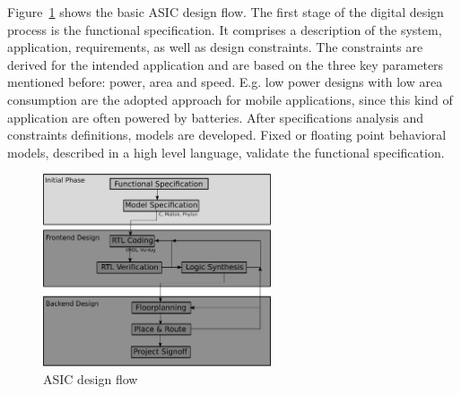 



Figure~\ref{fig:asic_flow} shows the basic ASIC design flow. The first stage of the digital design process is the functional specification. It comprises a description of the system, application, requirements, as well as design constraints. The constraints are derived for the intended application and are based on the three key parameters mentioned before: power, area and speed. E.g. low power designs with low area consumption are the adopted approach for mobile applications, since this kind of application are often powered by batteries. After specifications analysis and constraints definitions, models are developed. Fixed or floating point behavioral models, described in a high level language, validate the functional specification.



\begin{figure}[hbt]
  \centering
    \includegraphics[width=0.6\textwidth]
      {./figures/asic_flow.eps}
  \caption{ASIC design flow}
  \label{fig:asic_flow}
\end{figure}

